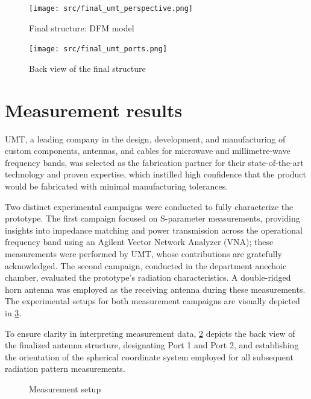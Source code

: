\documentclass[14pt,a4paper]{ntust_report}
\newlength{\twosubht}
\begin{document}
\begin{figure}[!ht]
    \centering
    \texttt{[image: src/final\_umt\_perspective.png]}
    \caption{\label{fig:final-umt-perspective}Final structure: DFM model}
\end{figure}

\begin{figure}[!ht]
    \centering
    \texttt{[image: src/final\_umt\_ports.png]}
    \caption{\label{fig:final-ports}Back view of the final structure}
\end{figure}

\section{Measurement results}
UMT, a leading company in the design, development, and manufacturing of custom components, antennas, and cables for microwave and millimetre-wave frequency bands, was selected as the fabrication partner for their state-of-the-art technology and proven expertise, which instilled high confidence that the product would be fabricated with minimal manufacturing tolerances.

Two distinct experimental campaigns were conducted to fully characterize the prototype. The first campaign focused on S-parameter measurements, providing insights into impedance matching and power transmission across the operational frequency band using an Agilent Vector Network Analyzer (VNA); these measurements were performed by UMT, whose contributions are gratefully acknowledged. The second campaign, conducted in the department anechoic chamber, evaluated the prototype's radiation characteristics. A double-ridged horn antenna was employed as the receiving antenna during these measurements. The experimental setups for both measurement campaigns are visually depicted in \cref{fig:measurement-setup}.

To ensure clarity in interpreting measurement data, \cref{fig:final-ports} depicts the back view of the finalized antenna structure, designating Port 1 and Port 2, and establishing the orientation of the spherical coordinate system employed for all subsequent radiation pattern measurements.

\begin{figure}[!ht]
    \sbox{}
    \setlength{\twosubht}{\ht\twosubbox}

    \centering
    \quad
    \caption{\label{fig:measurement-setup}Measurement setup}
\end{figure}
\end{document}
